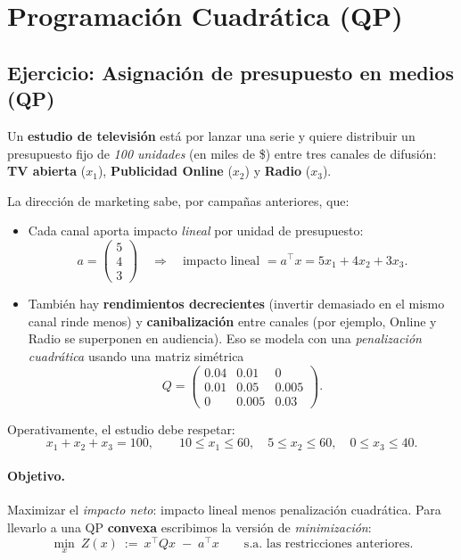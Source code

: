 \documentclass[12pt]{article}
\begin{document}
\section{Programación Cuadrática (QP)}

\subsection{Ejercicio: Asignación de presupuesto en medios (QP)}

Un \textbf{estudio de televisión} está por lanzar una serie y quiere distribuir un
presupuesto fijo de \emph{100 unidades} (en miles de \$) entre tres canales de
difusión: \textbf{TV abierta} ($x_1$), \textbf{Publicidad Online} ($x_2$) y
\textbf{Radio} ($x_3$). 

La dirección de marketing sabe, por campañas anteriores, que:
\begin{itemize}
  \item Cada canal aporta impacto \emph{lineal} por unidad de presupuesto: 
  \[
  a=\begin{pmatrix}5\\ 4\\ 3\end{pmatrix}
  \quad\Rightarrow\quad
  \text{impacto lineal }= a^\top x = 5x_1 + 4x_2 + 3x_3.
  \]
  \item También hay \textbf{rendimientos decrecientes} (invertir demasiado en el mismo canal rinde menos)
        y \textbf{canibalización} entre canales (por ejemplo, Online y Radio se superponen en audiencia).
        Eso se modela con una \emph{penalización cuadrática} usando una matriz simétrica
        \[
        Q=\begin{pmatrix}
        0.04 & 0.01 & 0    \\
        0.01 & 0.05 & 0.005\\
        0    & 0.005& 0.03
        \end{pmatrix}.
        \]
\end{itemize}

\noindent
Operativamente, el estudio debe respetar:
\[
x_1+x_2+x_3=100,
\qquad
10\le x_1\le 60,\quad 5\le x_2\le 60,\quad 0\le x_3\le 40.
\]

\paragraph{Objetivo.}
Maximizar el \emph{impacto neto}: impacto lineal menos penalización cuadrática.
Para llevarlo a una QP \textbf{convexa} escribimos la versión de \emph{minimización}:
\[
\min_{x}\ Z(x)\ :=\ x^\top Q x \;-\; a^\top x 
\qquad\text{s.a. las restricciones anteriores.}
\]
\end{document}
